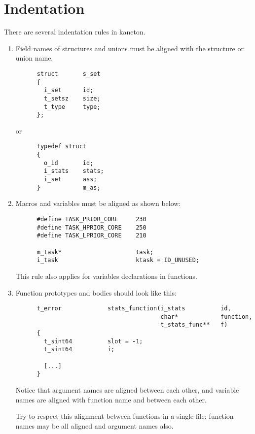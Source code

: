 %
%

\section{Indentation}

There are several indentation rules in kaneton.

\begin{enumerate}
  \item
    Field names of structures and unions must be aligned with the
    structure or union name.

    \begin{verbatim}
      struct       s_set
      {
        i_set      id;
        t_setsz    size;
        t_type     type;
      };
    \end{verbatim}

    or

    \begin{verbatim}
      typedef struct
      {
        o_id       id;
        i_stats    stats;
        i_set      ass;
      }            m_as;
    \end{verbatim}
  \item
    Macros and variables must be aligned as shown below:

    \begin{verbatim}
      #define TASK_PRIOR_CORE     230
      #define TASK_HPRIOR_CORE    250
      #define TASK_LPRIOR_CORE    210

      m_task*                     task;
      i_task                      ktask = ID_UNUSED;
    \end{verbatim}

    This rule also applies for variables declarations in functions.
  \item
    Function prototypes and bodies should look like this:

    \begin{verbatim}
      t_error             stats_function(i_stats          id,
                                         char*            function,
                                         t_stats_func**   f)
      {
        t_sint64          slot = -1;
        t_sint64          i;

        [...]
      }
    \end{verbatim}

    Notice that argument names are aligned between each other,
    and variable names are aligned with function name and between
    each other.

    Try to respect this alignment between functions in a single file:
    function names may be all aligned and argument names also.
\end{enumerate}

